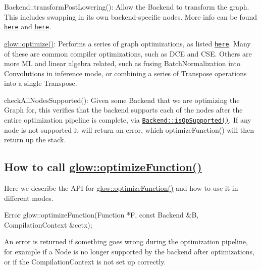 \begin{DoxyItemize}
\begin{DoxyItemize}
\end{DoxyItemize}
\item {\ttfamily Backend\+::transform\+Post\+Lowering()}\+: Allow the Backend to transform the graph. This includes swapping in its own backend-\/specific nodes. More info can be found \href{Backends.md#backend-abstract-class}{\tt here} and \href{NewBackendSpecificNode.md#steps}{\tt here}.
\item {\ttfamily \hyperlink{namespaceglow_a902cda054ebe738e9395e218ae09f291}{glow\+::optimize()}}\+: Performs a series of graph optimizations, as listed \href{Optimizations.md#set-of-supported-graph-optimizations}{\tt here}. Many of these are common compiler optimizations, such as D\+CE and C\+SE. Others are more ML and linear algebra related, such as fusing Batch\+Normalization into Convolutions in inference mode, or combining a series of Transpose operations into a single Transpose.
\item {\ttfamily check\+All\+Nodes\+Supported()}\+: Given some Backend that we are optimizing the Graph for, this verifies that the backend supports each of the nodes after the entire optimization pipeline is complete, via \href{Backends.md#backend-abstract-class}{\tt Backend\+::is\+Op\+Supported()}. If any node is not supported it will return an error, which {\ttfamily optimize\+Function()} will then return up the stack.
\end{DoxyItemize}

\subsection*{How to call {\ttfamily \hyperlink{namespaceglow_af6b48e8310d02c29962b5469885b3a75}{glow\+::optimize\+Function()}}}

Here we describe the A\+PI for {\ttfamily \hyperlink{namespaceglow_af6b48e8310d02c29962b5469885b3a75}{glow\+::optimize\+Function()}} and how to use it in different modes.


\begin{DoxyCode}
Error glow::optimizeFunction(Function *F, const Backend &B,
                                   CompilationContext &cctx);
\end{DoxyCode}


An error is returned if something goes wrong during the optimization pipeline, for example if a Node is no longer supported by the backend after optimizations, or if the Compilation\+Context is not set up correctly.


